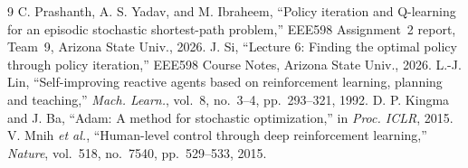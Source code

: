 \documentclass[conference]{IEEEtran}
\begin{document}
\begin{thebibliography}{9}
 C. Prashanth, A. S. Yadav, and M. Ibraheem, ``Policy iteration and Q-learning for
an episodic stochastic shortest-path problem,'' EEE598 Assignment~2 report, Team~9, Arizona
State Univ., 2026.
 J. Si, ``Lecture 6: Finding the optimal policy through policy iteration,''
EEE598 Course Notes, Arizona State Univ., 2026.
 L.-J. Lin, ``Self-improving reactive agents based on reinforcement learning,
planning and teaching,'' \emph{Mach. Learn.}, vol.~8, no.~3--4, pp.~293--321, 1992.
 D. P. Kingma and J. Ba, ``Adam: A method for stochastic optimization,'' in
\emph{Proc. ICLR}, 2015.
 V. Mnih \emph{et al.}, ``Human-level control through deep reinforcement
learning,'' \emph{Nature}, vol.~518, no.~7540, pp.~529--533, 2015.
\end{thebibliography}
\end{document}
